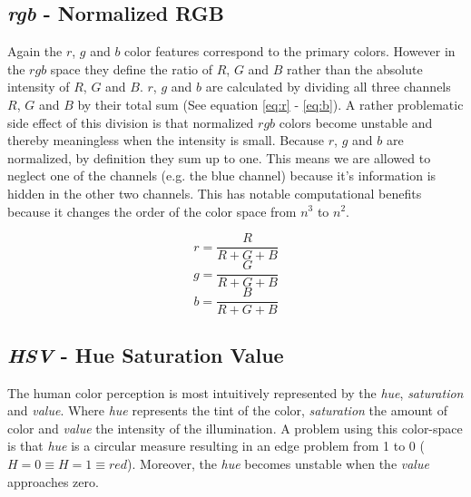 \documentclass[11pt]{article}
\begin{document}
\subsection{\textit{rgb} - Normalized RGB}
Again the $r$, $g$ and $b$  color features correspond to the primary colors.
However in the $rgb$ space they define the ratio of $R$, $G$ and $B$ rather than
the absolute intensity of $R$, $G$ and $B$. $r$, $g$ and $b$ are calculated by
dividing all three channels $R$, $G$ and $B$ by their total sum (See equation
\ref{eq:r} - \ref{eq:b}). A rather problematic side effect of this division is
that normalized $rgb$ colors become unstable and thereby meaningless when the
intensity is small. Because $r$, $g$ and $b$ are normalized, by definition they
sum up to one. This means we are allowed to neglect one of the channels (e.g.
the blue channel) because it's information is hidden in the other two channels.
This has notable computational benefits because it changes the order of the
color space from $n^3$ to $n^2$.

\begin{equation}
  r = \frac{R}{R+G+B}
  \label{eq:r}
\end{equation}
\begin{equation}
  g = \frac{G}{R+G+B}
  \label{eq:g}
\end{equation}
\begin{equation}
  b = \frac{B}{R+G+B}
  \label{eq:b}
\end{equation}

\subsection{\textit{HSV} - Hue Saturation Value}
The human color perception is most intuitively represented by the \emph{hue}, \emph{saturation}
and \emph{value}. Where \emph{hue} represents the tint of the color, \emph{saturation} the amount of color and
\emph{value} the intensity of the illumination. A problem using this color-space is that
\emph{hue} is a circular measure resulting in an edge problem from 1 to 0 ($H = 0 \equiv H = 1 \equiv red$).
Moreover, the \emph{hue} becomes unstable when the \emph{value} approaches zero.
\end{document}
